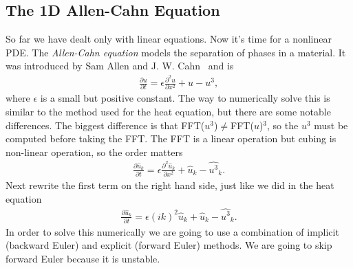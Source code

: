 \subsection{The 1D Allen-Cahn Equation}
So far we have dealt only with linear equations. Now it's time for a nonlinear PDE. The \emph{Allen-Cahn equation} models the separation of phases in a material. It was introduced by Sam Allen and J. W. Cahn~\cite{AllCah79}  and is 
\begin{eqnarray}
\frac{\partial u}{\partial t} = \epsilon\frac{\partial^2 u}{\partial x^2}+u-u^3, \label{eq:AllCah}
\end{eqnarray} 
where $\epsilon$ is a small but positive constant.  The way to numerically solve this is similar to the method used for the heat equation, but there are some notable differences. The biggest difference is that FFT($u^3$)$\neq$FFT($u$)$^3$, so the $u^3$ must be computed before taking the FFT. The FFT is a linear operation but cubing is non-linear operation, so the order matters
\begin{eqnarray}
\frac{\partial \hat{u}_k}{\partial t} = \epsilon\frac{\partial^2 \hat{u}_k}{\partial x^2}+\hat{u}_k-\widehat{u^3}_k. \label{Allen_Cahn_1D}
\end{eqnarray}
Next rewrite the first term on the right hand side, just like we did in the heat equation
\begin{eqnarray}
\frac{\partial \hat{u}_k}{\partial t} = \epsilon(ik)^2\hat{u}_k+\hat{u}_k-\widehat{u^3}_k.
\end{eqnarray}
In order to solve this numerically we are going to use a combination of implicit (backward Euler) and explicit (forward Euler) methods. We are going to skip forward Euler because it is unstable.

